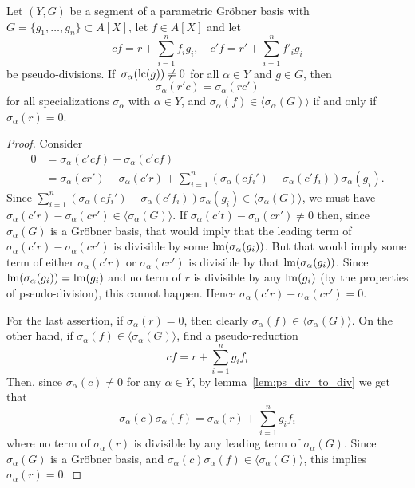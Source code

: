 \begin{lemma}\label{lem:ps_rem_unique}
  Let $(Y, G)$ be a segment of a parametric Gröbner basis with $G = \{g_{1}, \dots, g_{n}\} \subset A[X]$, let $f \in A[X]$ and let
  \[cf = r + \sum_{i=1}^{n} f_{i} g_{i}, \quad c'f = r' + \sum_{i=1}^{n} f'_{i} g_{i}\]
  be pseudo-divisions. If $\,\sigma_{\alpha}(\operatorname{lc}(g)) \neq 0$ for all $\alpha \in Y$ and $g \in G$, then
  \[\sigma_{\alpha}(r'c) = \sigma_{\alpha}(rc')\]
  for all specializations $\sigma_{\alpha}$ with $\alpha \in Y$, and $\sigma_{\alpha}(f) \in \langle \sigma_{\alpha}(G) \rangle$ if and only if $\sigma_{\alpha}(r) = 0$.
\end{lemma}
\begin{proof}
  Consider
  \begin{align*}
    0 &= \sigma_{\alpha}(c' c f) - \sigma_{\alpha}(c' c f) \\
      &= \sigma_{\alpha}(cr') - \sigma_{\alpha}(c'r) + \sum_{i=1}^{n}\left(\sigma_{\alpha}(c f_{i}') - \sigma_{\alpha}(c' f_{i})\right)\sigma_{\alpha}(g_{i}).
  \end{align*}
  Since $\sum_{i=1}^{n}(\sigma_{\alpha}(c f_{i}') - \sigma_{\alpha}(c' f_{i}))\sigma_{\alpha}(g_{i}) \in \langle \sigma_{\alpha}(G) \rangle$, we must have $\sigma_{\alpha}(c' r) - \sigma_{\alpha}(c r') \in \langle \sigma_{\alpha}(G) \rangle$. If $\sigma_{\alpha}(c't) - \sigma_{\alpha}(cr') \neq 0$ then, since $\sigma_{\alpha}(G)$ is a Gröbner basis, that would imply that the leading term of $\sigma_{\alpha}(c' r) - \sigma_{\alpha}(c r')$ is divisible by some $\operatorname{lm}(\sigma_{\alpha}(g_{i}))$. But that would imply some term of either $\sigma_{\alpha}(c' r)$ or $\sigma_{\alpha}(c r')$ is divisible by that $\operatorname{lm}(\sigma_{\alpha}(g_{i}))$. Since $\operatorname{lm}(\sigma_{\alpha}(g_{i})) = \operatorname{lm}(g_{i})$ and no term of $r$ is divisible by any $\operatorname{lm}(g_{i})$ (by the properties of pseudo-division), this cannot happen. Hence $\sigma_{\alpha}(c' r) - \sigma_{\alpha}(c r') = 0$.

  For the last assertion, if $\sigma_{\alpha}(r) = 0$, then clearly $\sigma_{\alpha}(f) \in \langle \sigma_{\alpha}(G) \rangle$. On the other hand, if $\sigma_{\alpha}(f) \in \langle \sigma_{\alpha}(G) \rangle$, find a pseudo-reduction
  \[c f = r + \sum_{i=1}^{n} g_{i} f_{i}\]
  Then, since $\sigma_{\alpha}(c) \neq 0$ for any $\alpha \in Y$, by lemma~\ref{lem:ps_div_to_div} we get that
  \[\sigma_{\alpha}(c)\sigma_{\alpha}(f) = \sigma_{\alpha}(r) + \sum_{i=1}^{n} g_{i} f_{i}\]
  where no term of $\sigma_{\alpha}(r)$ is divisible by any leading term of $\sigma_{\alpha}(G)$. Since $\sigma_{\alpha}(G)$ is a Gröbner basis, and $\sigma_{\alpha}(c) \sigma_{\alpha}(f) \in \langle \sigma_{\alpha}(G) \rangle$, this implies $\sigma_{\alpha}(r) = 0$.
\end{proof}

